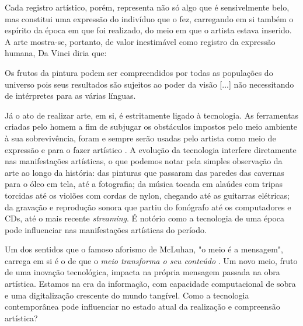 \documentclass[12pt, a4paper]{article}
\begin{document}
Cada registro artístico, porém, representa não só algo que é sensivelmente belo, mas constitui uma expressão do indivíduo que o fez, carregando em si
também o espírito da época em que foi realizado, do meio em que o artista estava inserido. 
A arte mostra-se, portanto, de valor inestimável como registro da expressão humana, Da Vinci diria que:

\begin{displayquote}
Os frutos da pintura podem ser compreendidos por todas as populações do universo pois seus resultados
são sujeitos ao poder da visão [...] não necessitando de intérpretes para as várias línguas.
\cite{davinci_thoughtsonart} 
\end{displayquote}



Já o ato de realizar arte, em si, é estritamente ligado à tecnologia.
As ferramentas criadas pelo homem a fim de subjugar os obstáculos impostos
pelo meio ambiente à sua sobrevivência, foram e sempre serão usadas pelo artista como meio de expressão e para o fazer artístico \cite{gouzouasis}.
A evolução da tecnologia interfere diretamente nas manifestações artísticas, o que podemos notar pela simples observação da arte ao longo da história: das pinturas que passaram das paredes das cavernas para o óleo em tela, até
a fotografia; da música tocada em alaúdes com tripas torcidas até os violões com cordas de nylon, chegando até as guitarras elétricas; 
da gravação e reprodução sonora que partiu do fonógrafo até os computadores e CDs, até o mais recente \emph{streaming}. 
É notório como a tecnologia de uma época pode influenciar nas manifestações artísticas do período. 

Um dos sentidos que o famoso aforismo de McLuhan, "o meio é a mensagem", carrega em si é o de que o 
\emph{meio transforma o seu conteúdo} \cite[p.50]{braga_mcluhan}. 
Um novo meio, fruto de uma inovação tecnológica, impacta na própria mensagem passada na obra artística.
Estamos na era da informação, com capacidade computacional de sobra e uma digitalização crescente do mundo tangível. 
Como a tecnologia contemporânea pode influenciar no estado atual da realização e compreensão artística?
\end{document}
